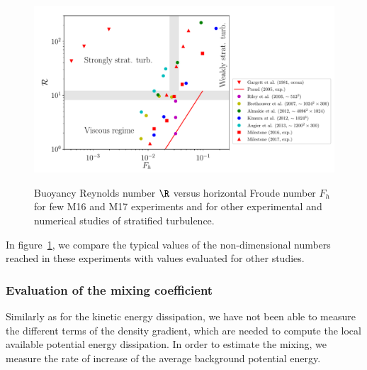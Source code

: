\begin{figure}[htp!]
\includegraphics[width=\figwidth]{tmp/fig_R_vs_Fh_other_studies_with_milestone17}
\label{fig:RvsFh:other}

\caption{Buoyancy Reynolds number $\R$ versus horizontal Froude number $F_h$
for few M16 and M17 experiments and for other experimental and numerical
studies of stratified turbulence.}

\end{figure}

In figure~\ref{fig:RvsFh:other}, we compare the typical values of the
non-dimensional numbers reached in these experiments with values evaluated for
other studies.


\subsubsection{Evaluation of the mixing coefficient}

Similarly as for the kinetic energy dissipation, we have not been able to
measure the different terms of the density gradient, which are needed to
compute the local available potential energy dissipation. In order to estimate
the mixing, we measure the rate of increase of the average background potential
energy.

